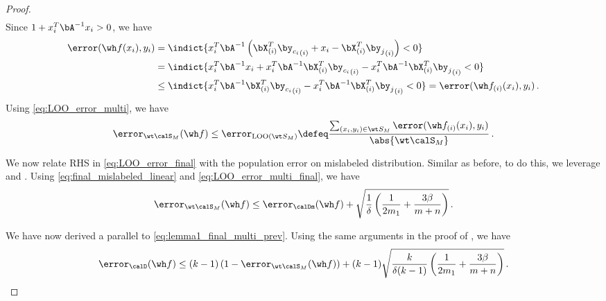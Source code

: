 \begin{proof}
\begin{align}
    \end{align}
    Since $1 + x_i^T \bA^{-1} x_i > 0$, we have 
    \begin{align}
        \error(\wh f(x_i), y_i ) &= \indict{ x_i^T \bA^{-1}  \left(\bXX{i}^T{\by_{c_i}}_{(i)} + x_i - \bXX{i}^T{\by_{j}}_{(i)}\right) < 0 } \\
        &= \indict{ x_i^T \bA^{-1} x_i +  x_i^T \bA^{-1}  \bXX{i}^T{\by_{c_i}}_{(i)}  - x_i^T\bA^{-1}  \bXX{i}^T{\by_{j}}_{(i)} < 0 } \\
        &\le \indict{  x_i^T \bA^{-1}  \bXX{i}^T{\by_{c_i}}_{(i)}  - x_i^T\bA^{-1}  \bXX{i}^T{\by_{j}}_{(i)} < 0  } = \error(\ff{i}(x_i), y_i ) \,.\label{eq:LOO_error_multi}
    \end{align}
    Using \eqref{eq:LOO_error_multi}, we have 
    \begin{align}
        \error_{\wt \calS_M } (\wh f) \le \error_{\text{LOO} (\wt S_M)} \defeq \frac{\sum_{(x_i, y_i) \in \wt S_M} \error(\ff{i}(x_i), y_i ) }{\abs{\wt \calS_M}}\label{eq:LOO_error_multi_final} \,.
    \end{align}
    
    We now relate RHS in \eqref{eq:LOO_error_final} 
    with the population error on mislabeled distribution. 
    Similar as before, to do this, we leverage  
    and . Using  \eqref{eq:final_mislabeled_linear} and \eqref{eq:LOO_error_multi_final}, we have 
    \begin{align}
        \error_{\wt \calS_M } (\wh f) \le \error_{\calDm}(\wh f)   + \sqrt{\frac{1}{\delta}\left(\frac{1}{2m_1} +\frac{3\beta}{m+n} \right)} \,. \label{eq:linear_multi_parallel_lem1}
    \end{align}
    
    We have now derived a parallel to \eqref{eq:lemma1_final_multi_prev}. Using the same arguments in the proof of , we have 
    \begin{align}
      \error_{\calD}(\wh f) \le  (k-1) \left( 1- \error_{ \wt \calS_M}(\wh f) \right)  + (k-1)\sqrt{\frac{k}{\delta(k-1)}\left(\frac{1}{2m_1} +\frac{3\beta}{m+n} \right)}  \,. \label{eq:lemma1_linear_final_multi}
    \end{align}
    

\end{proof}
